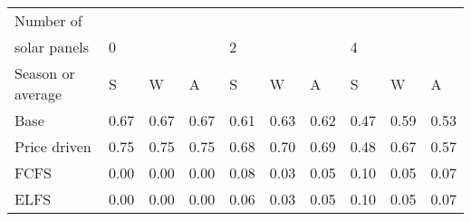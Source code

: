 \begin{table}[h] 
\centering 
\begin{tabular}{l|lll|lll|lll}Number of \\ solar panels&0& & &2& & &4& & \\ \hline 
Season or average & S & W & A & S & W & A & S & W & A \\ \hline 
Base&0.67&0.67&0.67&0.61&0.63&0.62&0.47&0.59&0.53 \\ 
Price driven&0.75&0.75&0.75&0.68&0.70&0.69&0.48&0.67&0.57 \\ 
FCFS&0.00&0.00&0.00&0.08&0.03&0.05&0.10&0.05&0.07 \\ 
ELFS&0.00&0.00&0.00&0.06&0.03&0.05&0.10&0.05&0.07 \\ 
\end{tabular} 
\end{table}
